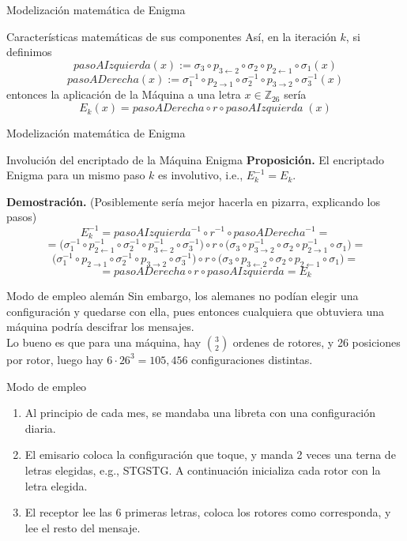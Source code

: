 \documentclass[aspectratio=169]{beamer}
\begin{document}
\begin{frame}{Modelización matemática de Enigma}
    \begin{block}{Características matemáticas de sus componentes}
Así, en la iteración $k$, si definimos 
$$pasoAIzquierda(x) := \sigma_3 \circ p_{3\leftarrow 2}\circ \sigma_2  \circ p_{2\leftarrow 1}\circ \sigma_1(x)$$
$$ pasoADerecha(x) := \sigma_1^{-1} \circ p_{2\rightarrow 1}\circ \sigma_2^{-1}  \circ p_{3\rightarrow 2}\circ \sigma_3^{-1}(x) $$
entonces la aplicación de la Máquina a una letra $x\in \mathbb Z_{26}$ sería
$$E_k(x) =  pasoADerecha \circ r \circ pasoAIzquierda \;(x)$$
    \end{block}
\end{frame}

\begin{frame}{Modelización matemática de Enigma}
    \begin{block}{Involución del encriptado de la Máquina Enigma}
        \textbf{Proposición.} El encriptado Enigma para un mismo paso $k$ es involutivo, i.e., $E_k^{-1} = E_k$.
    \end{block}
    
    \textbf{Demostración.} (Posiblemente sería mejor hacerla en pizarra, explicando los pasos)\pause \\  
    $$E_k^{-1} = pasoAIzquierda^{-1} \circ r^{-1} \circ pasoADerecha^{-1} =$$
    $$= \big(\sigma_1^{-1} \circ p_{2\leftarrow 1}^{-1}\circ \sigma_2^{-1}  \circ p_{3\leftarrow 2}^{-1}\circ \sigma_3^{-1}\big) \circ r \circ \big(  \sigma_3 \circ p_{3\rightarrow 2}^{-1}\circ \sigma_2  \circ p_{2\rightarrow 1}^{-1}\circ \sigma_1\big)=$$
    $$ \big( \sigma_1^{-1} \circ p_{2\rightarrow 1}\circ \sigma_2^{-1}  \circ p_{3\rightarrow 2}\circ \sigma_3^{-1}\big) \circ r \circ \big(\sigma_3 \circ p_{3\leftarrow 2}\circ \sigma_2  \circ p_{2\leftarrow 1}\circ \sigma_1\big) =$$
    $$= pasoADerecha \circ r \circ pasoAIzquierda = E_k$$
\end{frame}

\begin{frame}{Modo de empleo alemán}
Sin embargo, los alemanes no podían elegir una configuración y quedarse con ella, pues entonces cualquiera que obtuviera una máquina podría descifrar los mensajes.\pause \\  
Lo bueno es que para una máquina, hay $\binom{3}{2}$ ordenes de rotores, y 26 posiciones por rotor, luego hay $6\cdot 26^3 = 105, 456$ configuraciones distintas.
\begin{block}{Modo de empleo}
\begin{enumerate}
     \pause \item Al principio de cada mes, se mandaba una libreta con una configuración diaria.
     \pause \item El emisario coloca la configuración que toque, y manda 2 veces una terna de letras elegidas, e.g., STGSTG. A continuación inicializa cada rotor con la letra elegida.
     \pause \item El receptor lee las 6 primeras letras, coloca los rotores como corresponda, y lee el resto del mensaje.
\end{enumerate}
\end{block}
\end{frame}
\end{document}

